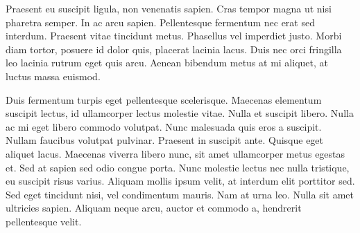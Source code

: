 \documentclass[english]{tktltiki}
\begin{document}
Praesent eu suscipit ligula, non venenatis sapien. Cras tempor magna ut nisi pharetra semper. In ac arcu sapien. Pellentesque fermentum nec erat sed interdum. Praesent vitae tincidunt metus. Phasellus vel imperdiet justo. Morbi diam tortor, posuere id dolor quis, placerat lacinia lacus. Duis nec orci fringilla leo lacinia rutrum eget quis arcu. Aenean bibendum metus at mi aliquet, at luctus massa euismod.

Duis fermentum turpis eget pellentesque scelerisque. Maecenas elementum suscipit lectus, id ullamcorper lectus molestie vitae. Nulla et suscipit libero. Nulla ac mi eget libero commodo volutpat. Nunc malesuada quis eros a suscipit. Nullam faucibus volutpat pulvinar. Praesent in suscipit ante. Quisque eget aliquet lacus. Maecenas viverra libero nunc, sit amet ullamcorper metus egestas et. Sed at sapien sed odio congue porta. Nunc molestie lectus nec nulla tristique, eu suscipit risus varius. Aliquam mollis ipsum velit, at interdum elit porttitor sed. Sed eget tincidunt nisi, vel condimentum mauris. Nam at urna leo. Nulla sit amet ultricies sapien. Aliquam neque arcu, auctor et commodo a, hendrerit pellentesque velit.

\pagebreak

%
%


\nocite{*}
%
%
%

%





\lastpage

\appendices

\pagestyle{empty}
\end{document}
